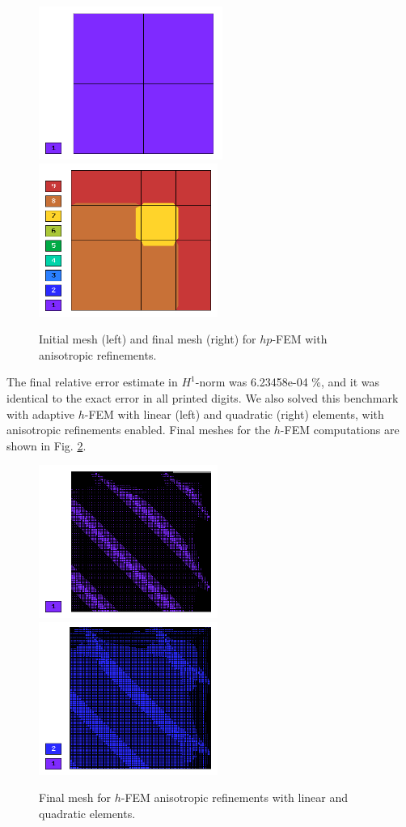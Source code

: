 \begin{figure}[!ht]
\centering
\includegraphics[height=5cm]{nist/nist-6/mesh_hp_aniso_init.png}\ \
\includegraphics[height=5cm]{nist/nist-6/mesh_hp_aniso.png}
\caption{Initial mesh (left) and final mesh (right) for $hp$-FEM with anisotropic refinements.}
\label{fig:nist-6-hp-aniso}
\end{figure}

The final relative error estimate in $H^1$-norm was 6.23458e-04 \%,
and it was identical to the exact error in all printed digits.
We also solved this benchmark with adaptive $h$-FEM
with linear (left) and quadratic (right)
elements, with anisotropic refinements enabled.
Final meshes for the $h$-FEM computations are shown
in Fig. \ref{fig:nist-6-h-aniso}.

\begin{figure}[!ht]
\centering
\includegraphics[height=5cm]{nist/nist-6/mesh_h1_aniso.png}\ \
\includegraphics[height=5cm]{nist/nist-6/mesh_h2_aniso.png}
\caption{Final mesh for $h$-FEM anisotropic refinements with linear and quadratic elements.}
\label{fig:nist-6-h-aniso}
\end{figure}

